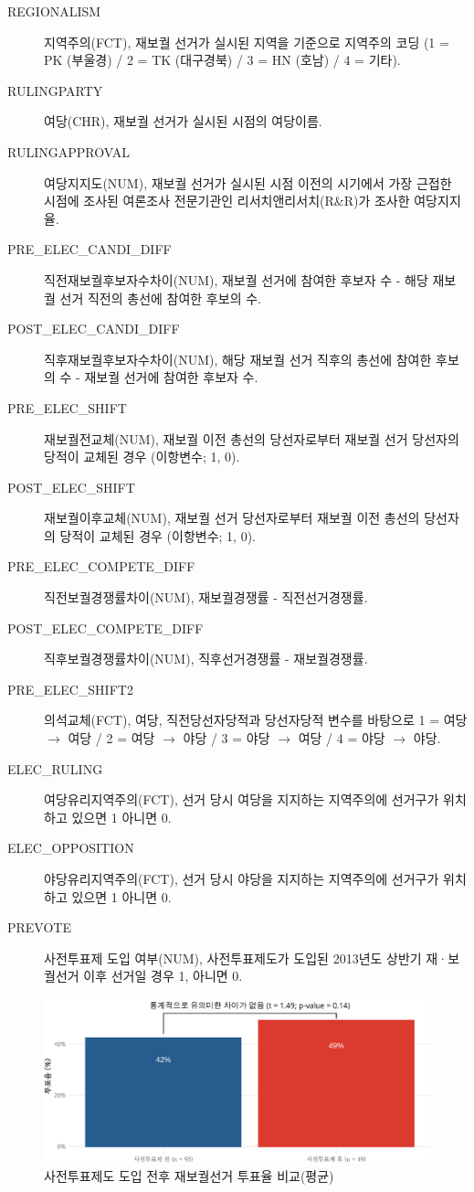 \documentclass[
  11pt,
  letter]{article}
\begin{document}
\begin{description}
\item[REGIONALISM]
지역주의(FCT), 재보궐 선거가 실시된 지역을 기준으로 지역주의 코딩 (1 =
PK (부울경) / 2 = TK (대구경북) / 3 = HN (호남) / 4 = 기타).
\item[RULINGPARTY]
여당(CHR), 재보궐 선거가 실시된 시점의 여당이름.
\item[RULINGAPPROVAL]
여당지지도(NUM), 재보궐 선거가 실시된 시점 이전의 시기에서 가장 근접한
시점에 조사된 여론조사 전문기관인 리서치앤리서치(R\&R)가 조사한
여당지지율.
\item[PRE\_ELEC\_CANDI\_DIFF]
직전재보궐후보자수차이(NUM), 재보궐 선거에 참여한 후보자 수 - 해당
재보궐 선거 직전의 총선에 참여한 후보의 수.
\item[POST\_ELEC\_CANDI\_DIFF]
직후재보궐후보자수차이(NUM), 해당 재보궐 선거 직후의 총선에 참여한
후보의 수 - 재보궐 선거에 참여한 후보자 수.
\item[PRE\_ELEC\_SHIFT]
재보궐전교체(NUM), 재보궐 이전 총선의 당선자로부터 재보궐 선거 당선자의
당적이 교체된 경우 (이항변수; 1, 0).
\item[POST\_ELEC\_SHIFT]
재보궐이후교체(NUM), 재보궐 선거 당선자로부터 재보궐 이전 총선의
당선자의 당적이 교체된 경우 (이항변수; 1, 0).
\item[PRE\_ELEC\_COMPETE\_DIFF]
직전보궐경쟁률차이(NUM), 재보궐경쟁률 - 직전선거경쟁률.
\item[POST\_ELEC\_COMPETE\_DIFF]
직후보궐경쟁률차이(NUM), 직후선거경쟁률 - 재보궐경쟁률.
\item[PRE\_ELEC\_SHIFT2]
의석교체(FCT), 여당, 직전당선자당적과 당선자당적 변수를 바탕으로 1 =
여당 \(\rightarrow\) 여당 / 2 = 여당 \(\rightarrow\) 야당 / 3 = 야당
\(\rightarrow\) 여당 / 4 = 야당 \(\rightarrow\) 야당.
\item[ELEC\_RULING]
여당유리지역주의(FCT), 선거 당시 여당을 지지하는 지역주의에 선거구가
위치하고 있으면 1 아니면 0.
\item[ELEC\_OPPOSITION]
야당유리지역주의(FCT), 선거 당시 야당을 지지하는 지역주의에 선거구가
위치하고 있으면 1 아니면 0.
\item[PREVOTE]
사전투표제 도입 여부(NUM), 사전투표제도가 도입된 2013년도 상반기
재·보궐선거 이후 선거일 경우 1, 아니면 0.
\end{description}

\begin{figure}
\centering
\includegraphics{Codebook_national_files/figure-latex/unnamed-chunk-19-1.pdf}
\caption{사전투표제도 도입 전후 재보궐선거 투표율 비교(평균)}
\end{figure}
\end{document}
